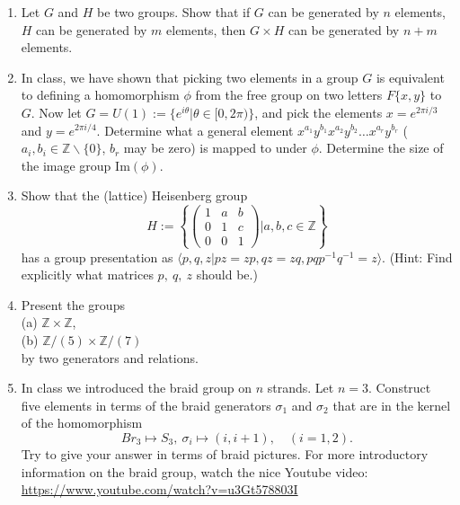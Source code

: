 \documentclass[12pt]{article}
\theoremstyle{plain}
\theoremstyle{definition}
\theoremstyle{remark}
\begin{document}
\begin{enumerate}
\item Let $G$ and $H$ be two groups. Show that if $G$ can be generated by $n$ elements, $H$ can be generated by $m$ elements, then $G\times H$ can be generated by $n+m$ elements.
\item In class, we have shown that picking two elements in a group $G$ is equivalent to defining a homomorphism $\phi$ from the free group on two letters $F\{x,y\}$ to $G$. Now let $G=U(1):=\{e^{i\theta}|\theta\in [0,2\pi)\}$, and pick the elements $x=e^{2\pi i/3}$ and $y=e^{2\pi i /4}$. Determine what a general element $x^{a_1}y^{b_1}x^{a_2}y^{b_2}\dots x^{a_r}y^{b_r}$ ($a_i,b_i\in \mathbb{Z}\backslash \{0\}$, $b_r$ may be zero) is mapped to under $\phi$. Determine the size of the image group $\mathrm{Im}(\phi)$.
\item Show that the (lattice) Heisenberg group
\[
H:=\left\{\left(
\begin{array}{ccc}
1 & a & b\\
0 & 1 & c\\
0 & 0 & 1
\end{array}
\right)\Bigg|a,b,c\in \mathbb{Z}\right\}
\]
has a group presentation as $\langle p,q,z|pz=zp, qz=zq, pqp^{-1}q^{-1}=z\rangle$. (Hint: Find explicitly what matrices $p,~q,~z$ should be.)
\item Present the groups\\
(a) $\mathbb{Z}\times \mathbb{Z}$, \\
(b) $\mathbb{Z}/(5)\times \mathbb{Z}/(7)$ \\
by two generators and relations.
\item In class we introduced the braid group on $n$ strands. Let $n=3$. Construct five elements in terms of the braid generators $\sigma_1$ and $\sigma_2$ that are in the kernel of the homomorphism
    \[Br_3\mapsto S_3,~\sigma_i\mapsto (i,i+1), \quad(i=1,2).\]
Try to give your answer in terms of braid pictures.
For more introductory information on the braid group, watch the nice Youtube video:\\
\href{https://www.youtube.com/watch?v=u3Gt578803I}{https://www.youtube.com/watch?v=u3Gt578803I}
 \end{enumerate}
\end{document}
